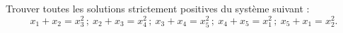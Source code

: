 Trouver toutes les solutions strictement positives du système suivant :
\[
x_1 + x_2 = x_3^2\,;\ x_2 + x_3 = x_4^2\,;\ x_3 + x_4 = x_5^2\,;\ x_4 + x_5 = x_1^2\,;\ x_5 + x_1 = x_2^2.
\]
